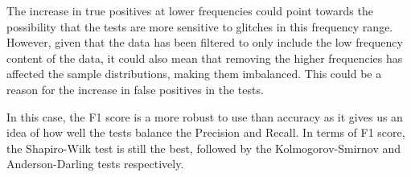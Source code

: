 \documentclass[12pt]{article}
\begin{document}
\medskip
\noindent The increase in true positives at lower frequencies could point towards the possibility that the tests are more sensitive to glitches in this frequency range. However, given that the data has been filtered to only include the low frequency content of the data, it could also mean that removing the higher frequencies has affected the sample distributions, making them imbalanced. This could be a reason for the increase in false positives in the tests.

\medskip
\noindent In this case, the F1 score is a more robust to use than accuracy as it gives us an idea of how well the tests balance the Precision and Recall. In terms of F1 score, the Shapiro-Wilk test is still the best, followed by the Kolmogorov-Smirnov and Anderson-Darling tests respectively.

\end{document}
